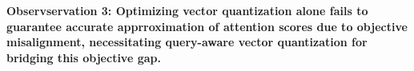 \noindent
\textbf{
    Observservation 3:
    Optimizing vector quantization alone fails to guarantee accurate apprroximation of attention scores due to objective misalignment, necessitating query-aware vector quantization for bridging this objective gap. 
}




